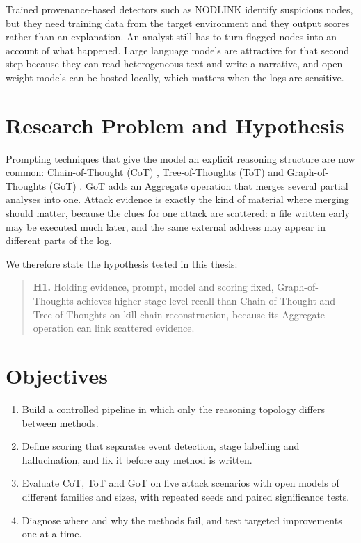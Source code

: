 \documentclass[a4paper, 12pt]{report}
\theoremstyle{definition}
\begin{document}
Trained provenance-based detectors such as NODLINK \cite{li2024nodlink} identify suspicious nodes, but they need training data from the target environment and they output scores rather than an explanation. An analyst still has to turn flagged nodes into an account of what happened. Large language models are attractive for that second step because they can read heterogeneous text and write a narrative, and open-weight models can be hosted locally, which matters when the logs are sensitive.

\section{Research Problem and Hypothesis}
Prompting techniques that give the model an explicit reasoning structure are now common: Chain-of-Thought (CoT) \cite{wei2022cot}, Tree-of-Thoughts (ToT) \cite{yao2023tot} and Graph-of-Thoughts (GoT) \cite{besta2024got}. GoT adds an Aggregate operation that merges several partial analyses into one. Attack evidence is exactly the kind of material where merging should matter, because the clues for one attack are scattered: a file written early may be executed much later, and the same external address may appear in different parts of the log.

We therefore state the hypothesis tested in this thesis:

\begin{quote}
\textbf{H1.} Holding evidence, prompt, model and scoring fixed, Graph-of-Thoughts achieves higher stage-level recall than Chain-of-Thought and Tree-of-Thoughts on kill-chain reconstruction, because its Aggregate operation can link scattered evidence.
\end{quote}

\section{Objectives}
\begin{enumerate}
	\item Build a controlled pipeline in which only the reasoning topology differs between methods.
	\item Define scoring that separates event detection, stage labelling and hallucination, and fix it before any method is written.
	\item Evaluate CoT, ToT and GoT on five attack scenarios with open models of different families and sizes, with repeated seeds and paired significance tests.
	\item Diagnose where and why the methods fail, and test targeted improvements one at a time.
\end{enumerate}
\end{document}
